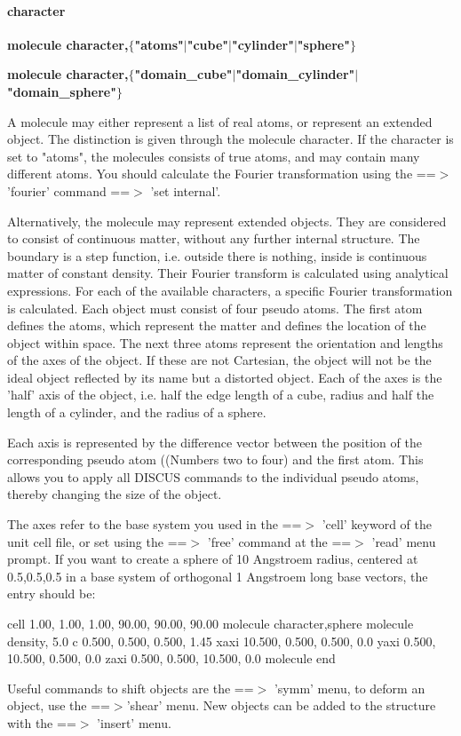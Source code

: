 \paragraph*{character}
{\bf molecule character,$ \{$"atoms"$| $"cube"$| $"cylinder"$| $"sphere"$\} $ \par }
{\bf molecule character,$ \{$"domain\_cube"$| $"domain\_cylinder"$| $"domain\_sphere"$\} $ \par }
\par
\vspace{3pt}
A molecule may either represent a list of real atoms, or represent 
an extended object. The distinction is given through the molecule 
character. If the character is set to "atoms", the molecules consists 
of true atoms, and may contain many different atoms. You should 
calculate the Fourier transformation using the ==$> $ 'fourier' 
command ==$> $ 'set internal'. 
\par
Alternatively, the molecule may represent extended objects. They are 
considered to consist of continuous matter, without any further 
internal structure. The boundary is a step function, i.e. outside 
there is nothing, inside is continuous matter of constant density. 
Their Fourier transform is calculated using analytical expressions. 
For each of the available characters, a specific Fourier transformation 
is calculated. Each object must consist of four pseudo atoms. 
The first atom defines the atoms, which represent the matter and 
defines the location of the object within space. 
The next three atoms represent the orientation and lengths of the 
axes of the object. If these are not Cartesian, the object will not 
be the ideal object reflected by its name but a distorted object. 
Each of the axes is the 'half' axis of the object, i.e. half the 
edge length of a cube, radius and half the length of a cylinder, 
and the radius of a sphere. 
\par
Each axis is represented by the difference vector between the 
position of the corresponding pseudo atom ((Numbers two to four) and 
the first atom. This allows you to apply all DISCUS commands to 
the individual pseudo atoms, thereby changing the size of the object. 
\par
The axes refer to the base system you used in the ==$> $ 'cell' 
keyword of the unit cell file, or set using the ==$> $ 'free' command 
at the ==$> $ 'read' menu prompt. If you want to create a sphere of 
10 Angstroem radius, centered at 0.5,0.5,0.5 in a base system 
of orthogonal 1 Angstroem long base vectors, the entry should be: 
\par
cell  1.00, 1.00, 1.00,  90.00, 90.00, 90.00 
molecule character,sphere 
molecule density, 5.0 
c       0.500,  0.500,  0.500, 1.45 
xaxi   10.500,  0.500,  0.500, 0.0 
yaxi    0.500, 10.500,  0.500, 0.0 
zaxi    0.500,  0.500, 10.500, 0.0 
molecule end 
\par
\par
Useful commands to shift objects are the ==$> $ 'symm' menu, 
to deform an object, use the ==$> $'shear' menu. 
New objects can be added to the structure with the ==$> $ 'insert' menu. 

